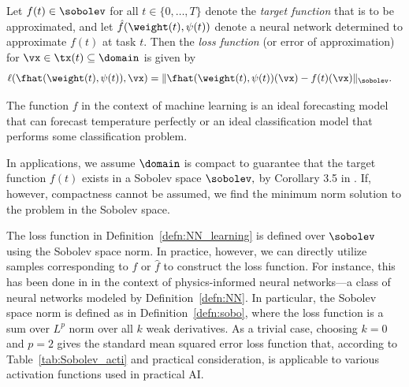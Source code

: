 \begin{definition}\label{defn:NN_learning}
        Let $f(t)\in \sobolev$ for all $t\in \{0,\ldots, T\}$ denote the \textit{target function} that is to be approximated, and let $\hat{f}(\weight(t),\psi(t))$ denote a neural network determined to approximate $f(t)$ at task $t.$ Then the \textit{loss function} (or error of approximation) for $\vx \in \tx(t) \subseteq \domain$ is given by 
        \begin{align*}
            \ell(\fhat(\weight(t),\psi(t)), \vx) & = \| \fhat(\weight(t),\psi(t))(\vx)-f(t)(\vx)\|_{\sobolev}.
        \end{align*} 
    \end{definition}
The function $f$ in the context of machine learning is an ideal forecasting model that can forecast temperature perfectly or an ideal classification model that performs some classification problem.
\begin{remark}
    In applications, we  assume $\domain$ is compact to guarantee that the target function $f(t)$ exists in a Sobolev space $\sobolev,$ by Corollary 3.5 in \cite{mahanNonclosednessSetsNeural2021a}. If, however,  compactness cannot be assumed, we find the minimum norm solution to the problem in the Sobolev space.
\end{remark}
The loss function in Definition~\ref{defn:NN_learning} is defined over $\sobolev$ using the Sobolev space norm. In practice, however, we can directly utilize samples corresponding to $f$ or $\hat{f}$ to construct the loss function. For instance, this has been done in \cite{son2021sobolev} in the context of  physics-informed neural networks---a class of neural networks  modeled by Definition~\ref{defn:NN}. In particular, the Sobolev space norm is defined as in Definition~\ref{defn:sobo}, where the loss function is a sum over $L^p$ norm over all $k$ weak derivatives. As a trivial case, choosing $k=0$ and $p=2$ gives the standard mean squared error loss function that,  according to  Table~\ref{tab:Sobolev_acti} and practical consideration, is applicable to various activation functions used in practical AI.

